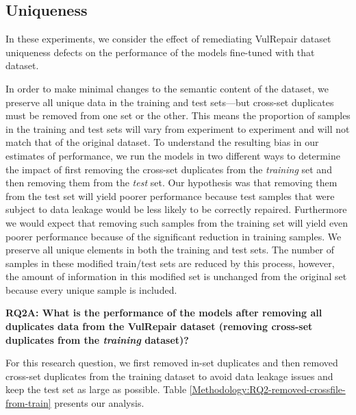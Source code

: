 

\subsection{Uniqueness}\label{Uniqueness}

In these experiments, we consider the effect of remediating VulRepair dataset uniqueness defects on the performance of the models fine-tuned with that dataset.

 In order to make minimal changes to the semantic content of the dataset, we preserve all unique data in the training and test sets---but cross-set duplicates must be removed from one set or the other.
This means the proportion of samples in the training and test sets will vary from experiment to experiment and will not match that of the original dataset.
To understand the resulting bias in our estimates of performance, we run the models in two different ways to determine the impact of first removing the cross-set duplicates from the \emph{training} set and then removing them from the \emph{test} set.
Our hypothesis was that removing them from the test set will yield poorer performance because test samples that were subject to data leakage would be less likely to be correctly repaired.
Furthermore we would expect that removing such samples from the training set will yield even poorer performance because of the significant reduction in training samples. 
We preserve all unique elements in both the training and test sets.
The number of samples in these modified train/test sets are reduced by this process, however, the amount of information in this modified set is unchanged from the original set because every unique sample is included.

\textbf{RQ2A: 
What is the performance of the models after removing all duplicates data from the VulRepair dataset (removing cross-set duplicates from the \emph{training} dataset)?}

For this research question, we first removed in-set duplicates and then removed cross-set duplicates from the training dataset to avoid data leakage issues and keep the test set as large as possible. Table \ref{Methodology:RQ2-removed-crossfile-from-train} presents our analysis.


